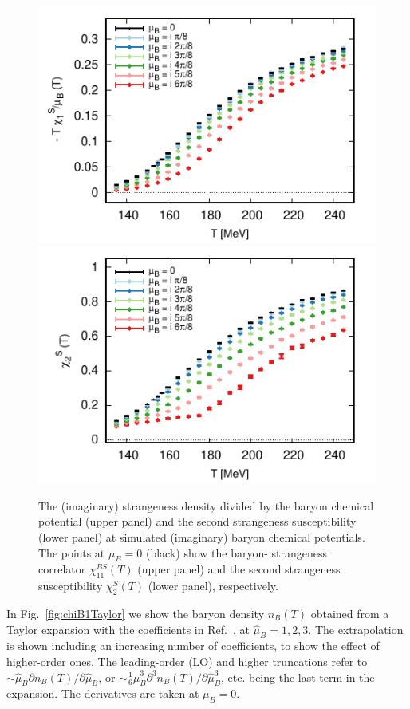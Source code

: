 \documentclass[aps,prd,twocolumn,superscriptaddress]{revtex4-2}
\newcommand \hmu {\hat{\mu}}
\begin{document}
\begin{figure}[h]
\includegraphics[width=\linewidth]{figures/shift_48x12_BS.pdf}
\includegraphics[width=\linewidth]{figures/shift_48x12_S2.pdf}
\caption{The (imaginary) strangeness density divided 
by the baryon chemical potential (upper panel) and the 
second strangeness susceptibility (lower panel) at 
simulated (imaginary) baryon chemical potentials. The 
points at $\mu_B=0$ (black) show the baryon-
strangeness correlator $\chi_{11}^{BS}(T)$ (upper 
panel) and the second strangeness susceptibility 
$\chi_2^S(T)$ (lower panel), respectively.}
\label{fig:shift_BS_S2}
\end{figure}

In Fig.~\ref{fig:chiB1Taylor} we show the baryon density $n_B(T)$ obtained from
a Taylor expansion with the coefficients in  Ref.~\cite{Borsanyi:2018grb}, at
$\hmu_B = 1, 2, 3$. The extrapolation is shown including an increasing number
of coefficients, to show the effect of higher-order ones. 
The leading-order (LO) and higher truncations
refer to $\sim \hmu_B \partial n_B(T)/\partial\hmu_B$, or
$\sim \frac16 \hmu_B^3 \partial^3 n_B(T)/\partial\hmu_B^3$, etc.  being
the last term in the expansion. The derivatives are taken at $\mu_B=0$.
\end{document}
